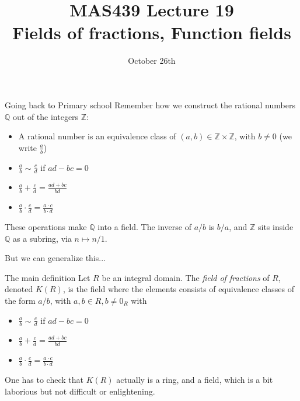 \documentclass{beamer}
\title{MAS439 Lecture 19 \\ Fields of fractions, Function fields}
\date{October 26th}
\newcommand{\Z}{\mathbb{Z}}
\newcommand{\Q}{\mathbb{Q}}
\begin{document}
\begin{frame}
\titlepage
\end{frame}

\begin{frame}{Going back to Primary school}
    Remember how we construct the rational numbers $\Q$ out of the integers $\Z$:
    \begin{itemize}
    \item A rational number is an equivalence class of $(a,b)\in\Z\times\Z$, with $b\neq 0$ (we write $\frac{a}{b}$)
    \item $\frac{a}{b}\sim \frac{c}{d}$ if $ad-bc=0$
    \item $\frac{a}{b}+\frac{c}{d}=\frac{ad+bc}{bd}$
    \item $\frac{a}{b}\cdot \frac{c}{d}=\frac{a\cdot c}{b\cdot d}$
\end{itemize}
These operations make $\Q$ into a field. The inverse of $a/b$ is $b/a$, and $\Z$ sits inside $\Q$ as a subring, via $n\mapsto n/1$.

But we can generalize this...    
\end{frame}

\begin{frame}{The main definition}
Let $R$ be an \alert{integral domain}.  The \emph{field of fractions} of $R$, denoted $K(R)$, is the field where the elements consists of equivalence classes of the form $a/b$, with $a,b\in R, b\neq 0_R$ with  
\begin{itemize}
\item $\frac{a}{b}\sim \frac{c}{d}$ if $ad-bc=0$
    \item $\frac{a}{b}+\frac{c}{d}=\frac{ad+bc}{bd}$
    \item $\frac{a}{b}\cdot \frac{c}{d}=\frac{a\cdot c}{b\cdot d}$
\end{itemize}


One has to check that $K(R)$ actually is a ring, and a field, which is a bit laborious but not difficult or enlightening.
\end{frame}
\end{document}

